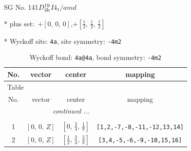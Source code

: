 \documentclass[fleqn,8pt]{jsarticle}
\begin{document}
\setcounter{MaxMatrixCols}{32}

\renewcommand{\tablename}{Table~}
\renewcommand{\figurename}{Figure~}
\begin{center}
\LARGE
SG No. 141\quad$D_{\rm 4h}^{19}$\quad$I4_1/amd$\quad[ tetragonal ]
\end{center}

* plus set:\,\,\,$+\left[ 0,\, 0,\, 0 \right]$,\quad $+\left[ \frac{1}{2},\, \frac{1}{2},\, \frac{1}{2} \right]$


* Wyckoff site: {\tt 4a}, site symmetry: {\tt -4m2}
\renewcommand{\arraystretch}{1.2}
\begin{longtable}{cccc}
\caption{Wyckoff bond: {\tt 4a@4a}, bond symmetry: {\tt -4m2}}
 \\
 \hline \hline
No. & vector & center & mapping \\ \hline \endfirsthead

\multicolumn{3}{l}{\tablename\ \thetable{}} \\
 \hline \hline
No. & vector & center & mapping \\ \hline \endhead

 \hline \hline
\multicolumn{3}{r}{\footnotesize\it continued ...} \\ \endfoot

 \hline \hline
\multicolumn{3}{r}{} \\ \endlastfoot

1 & $\left[ 0,\, 0,\, Z \right]$ & $\left[ 0,\, \frac{3}{4},\, \frac{1}{8} \right]$ & {\tt [1,2,-7,-8,-11,-12,13,14]} \\ \hline
2 & $\left[ 0,\, 0,\, Z \right]$ & $\left[ \frac{1}{2},\, \frac{3}{4},\, \frac{3}{8} \right]$ & {\tt [3,4,-5,-6,-9,-10,15,16]} \\
\end{longtable}
\renewcommand{\arraystretch}{1.2}
\end{document}

